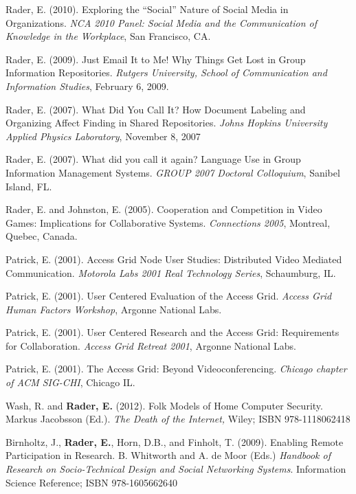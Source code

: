 \documentclass[9pt]{extarticle}
\makeatletter
\renewcommand{\section}{%
  \@startsection{section}{1}{0em}{\baselineskip}{3pt}{\large\bfseries\textsc}}
\makeatother
\begin{document}
Rader, E. (2010). Exploring the ``Social'' Nature of Social Media in Organizations. \emph{NCA 2010 Panel: Social Media and the Communication of Knowledge in the Workplace}, San Francisco, CA.

Rader, E. (2009). Just Email It to Me! Why Things Get Lost in Group Information Repositories. \emph{Rutgers University, School of Communication and Information Studies}, February 6, 2009.

Rader, E. (2007). What Did You Call It? How Document Labeling and Organizing Affect Finding in Shared Repositories. \emph{Johns Hopkins University Applied Physics Laboratory}, November 8, 2007

Rader, E. (2007). What did you call it again? Language Use in Group Information Management Systems. \emph{GROUP 2007 Doctoral Colloquium}, Sanibel Island, FL.

Rader, E. and Johnston, E. (2005). Cooperation and Competition in Video Games: Implications for Collaborative Systems. \emph{Connections 2005}, Montreal, Quebec, Canada.

Patrick, E. (2001). Access Grid Node User Studies: Distributed Video Mediated Communication. \emph{Motorola Labs 2001 Real Technology Series}, Schaumburg, IL.

Patrick, E. (2001). User Centered Evaluation of the Access Grid. \emph{Access Grid Human Factors Workshop}, Argonne National Labs.

Patrick, E. (2001). User Centered Research and the Access Grid: Requirements for Collaboration. \emph{Access Grid Retreat 2001}, Argonne National Labs.

Patrick, E. (2001). The Access Grid: Beyond Videoconferencing. \emph{Chicago chapter of ACM SIG-CHI}, Chicago IL.


\section{Book Chapters}

Wash, R. and \textbf{Rader, E.} (2012). Folk Models of Home Computer Security. Markus Jacobsson (Ed.). \emph{The Death of the Internet,} Wiley; ISBN 978-1118062418

Birnholtz, J., \textbf{Rader, E.}, Horn, D.B., and Finholt, T. (2009). Enabling Remote Participation in Research. B. Whitworth and A. de Moor (Eds.) \emph{Handbook of Research on Socio-Technical Design and Social Networking Systems}. Information Science Reference; ISBN 978-1605662640
\end{document}
